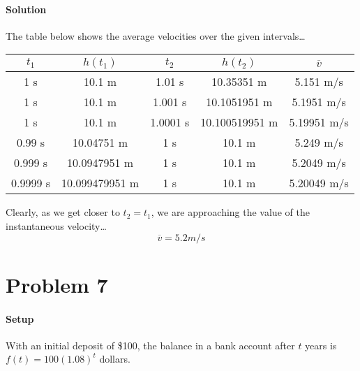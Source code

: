 \documentclass{article}
\begin{document}
  \paragraph{Solution} The table below shows the average velocities over the given intervals\dots
  \begin{center}
    \begin{tabular}{||c c c c | c||}
     \hline
     \(t_{1}\) & \(h(t_{1})\) & \(t_{2}\) & \(h(t_{2})\) & \(\overline{v}\) \\
     \hline\hline
     1 s & 10.1 m & 1.01 s & 10.35351 m & 5.151 m/s \\
     \hline
     1 s & 10.1 m & 1.001 s & 10.1051951 m & 5.1951 m/s \\
     \hline
     1 s & 10.1 m & 1.0001 s & 10.100519951 m & 5.19951 m/s \\
     \hline
     0.99 s & 10.04751 m & 1 s & 10.1 m & 5.249 m/s \\
     \hline
     0.999 s & 10.0947951 m & 1 s & 10.1 m & 5.2049 m/s \\
     \hline
     0.9999 s & 10.099479951 m & 1 s & 10.1 m & 5.20049 m/s \\
     \hline
    \end{tabular}
  \end{center}

  Clearly, as we get closer to \(t_{2} = t_{1}\), we are approaching the value of the instantaneous velocity\dots
  \begin{equation}
    \boxed{\overline{v} = 5.2 m/s}
  \end{equation}
  \newpage

  \section{Problem 7}
  \paragraph{Setup} With an initial deposit of \$100, the balance in a bank account after \(t\) years is \(f(t) = 100(1.08)^t\) dollars.
\end{document}
